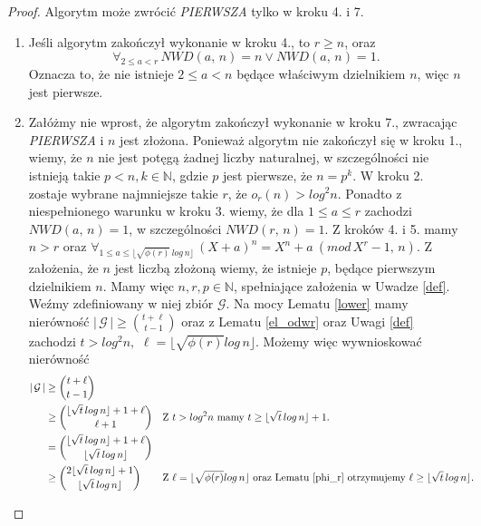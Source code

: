 \documentclass[declaration,shortabstract]{iithesis}
\theoremstyle{definition}
\theoremstyle{remark} \newtheorem{observation}{Obserwacja}
\theoremstyle{plain} \newtheorem{theorem}{Twierdzenie}
\theoremstyle{plain} \newtheorem{lemma}{Lemat}
\theoremstyle{remark} \newtheorem*{remark*}{Uwaga}
\theoremstyle{reminder} \newtheorem*{reminder*}{Przypomnienie}
\begin{document}
\begin{proof}
	Algorytm może zwrócić \textit{PIERWSZA} tylko w kroku 4. i 7.
	\begin{enumerate}[label=\arabic*.,leftmargin=.4in]
		\item Jeśli algorytm zakończył wykonanie w kroku 4., to $r \geq n$, oraz \[\forall_{2 \leq a < r} \, NWD(a, \, n) = n \vee NWD(a, \, n) = 1.\] Oznacza to, że nie istnieje $2 \leq a < n$ będące właściwym dzielnikiem $n$, więc $n$ jest pierwsze.
		\item Załóżmy nie wprost, że algorytm zakończył wykonanie w kroku 7., zwracając \textit{PIERWSZA} i $n$ jest złożona. Ponieważ algorytm nie zakończył się w kroku 1., wiemy, że $n$ nie jest potęgą żadnej liczby naturalnej, w szczególności nie istnieją takie $p < n, k \in \mathbb{N}$, gdzie $p$ jest pierwsze, że $n = p^k$. W kroku 2. zostaje wybrane najmniejsze takie $r$, że $o_r(n) > log^2n$. Ponadto z niespełnionego warunku w kroku 3. wiemy, że dla $1 \leq a \leq r$ zachodzi $NWD(a, \, n) = 1$, w szczególności $NWD(r, \, n) = 1$. Z kroków 4. i 5. mamy $n > r$ oraz ${\forall_{1 \leq a \leq \lfloor \sqrt{\phi(r)} \, log \, n \rfloor} \, (X + a)^n = X^n + a \: (mod \, X^r - 1, \, n).}$ Z założenia, że $n$ jest liczbą złożoną wiemy, że istnieje $p$, będące pierwszym dzielnikiem $n$. Mamy więc $n, r, p \in \mathbb{N}$, spełniające założenia w Uwadze \ref{def}. Weźmy zdefiniowany w niej zbiór $\mathcal{G}$. Na mocy Lematu \ref{lower} mamy nierówność $| \, \mathcal{G} \, | \geq {t + \ell \choose t - 1}$ oraz z Lematu \ref{el_odwr} oraz Uwagi \ref{def} zachodzi ${t > log^2n,}$ ${\ell = \lfloor \sqrt{\phi(r)}log \, n \rfloor.}$ Możemy więc wywnioskować nierówność
		      \begin{align*}
		      	| \, \mathcal{G} \, | &\geq {t + \ell \choose t - 1} \\
		      	  & \geq {\lfloor \sqrt{t}\, log \, n \rfloor + 1 + \ell \choose \ell + 1}                      &   & \text{Z ${t > log^2n}$ mamy ${t \geq \lfloor \sqrt{t}\, log \, n} \rfloor + 1$.}                                                               \\
		      	& = {\lfloor \sqrt{t}\, log \, n \rfloor + 1 + \ell \choose \lfloor \sqrt{t}\, log \, n \rfloor} \\
		      	  & \geq {2\lfloor \sqrt{t}\, log \, n \rfloor + 1 \choose \lfloor \sqrt{t}\, log \, n \rfloor} &   & \text{Z $\ell = \lfloor \sqrt{\phi(r)}log \, n \rfloor$ oraz Lematu \ref{phi_r} otrzymujemy $\ell \geq \lfloor \sqrt{t} \, log \, n \rfloor$.} \\

\end{align*}
\end{enumerate}
\end{proof}
\end{document}
